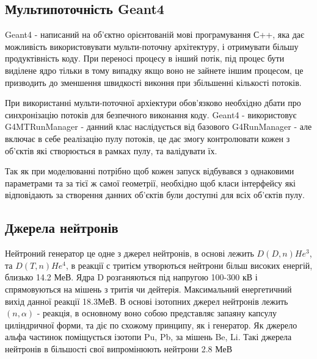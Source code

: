 \documentclass[a4paper, 14pt]{article}
\numberwithin{equation}{section}
\numberwithin{table}{section}
\begin{document}
\subsection{Мультипоточність Geant4}
Geant4 - написаний на об'єктно орієнтованій мові програмування С++, яка дає можливість використовувати мульти-поточну архітектуру, і отримувати більшу продуктівність коду. При переносі процесу в інший потік, під процес бути виділене ядро тільки в тому випадку якщо воно не зайнете іншим процесом, це призводить до зменшення швидкості виконня при збільшенні кількості потоків. 

При використанні мульти-поточної архіектури обов'язково необхідно дбати про синхронізацію потоків для безпечного виконання коду. Geant4 - використовує G4MTRunManager - данний клас наслідується від базового G4RunManager - але включає в себе реалізацію пулу потоків, це дає змогу контролювати кожен з об'єктів які створюється в рамках пулу, та валідувати їх. 

Так як при моделюванні потрібно щоб кожен запуск відбувався з однаковими параметрами та за тієї ж самої геометрії, необхідно щоб класи інтерфейсу які відповідають за створення данних об'єктів були доступні для всіх об'єктів пулу.

\subsection{Джерела нейтронів}
	Нейтроний генератор це одне з джерел нейтронів, в основі лежить $D(D,n)He^3 $, та $D(T, n)He^4$, в реакції с тритієм утворються нейтрони більш високих енергій, близько 14.2 МеВ. Ядра D розганяються під напругою 100-300 кВ і спрямовуються на мішень з тритія чи дейтерія. Максимальний енергетичний вихід данної реакції 18.3МеВ. 
	В основі ізотопних джерел нейтронів лежить $(n,\alpha)$ - реакція, в основному воно собою представляє запаяну капсулу циліндричної форми, та діє по схожому принципу, як і генератор. Як джерело альфа частинок поміщується ізотопи Pu, Pb, за мішень Be, Li. Такі джерела нейтронів в більшості свої випромінюють нейтрони 2.8 МеВ

\newpage
\end{document}
